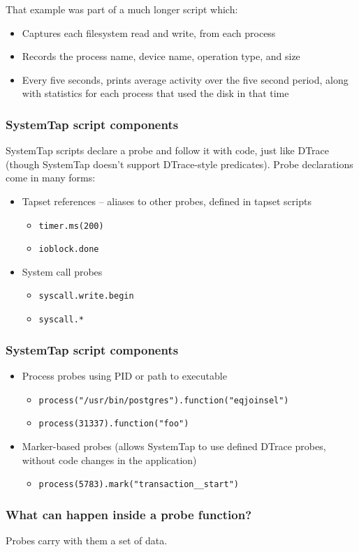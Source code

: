 \documentclass{beamer}
\begin{document}
\begin{frame}
     That example was part of a much longer script which:
     \begin{itemize}
         \item Captures each filesystem read and write, from each process
         \item Records the process name, device name, operation type, and size
         \item Every five seconds, prints average activity over the five second period, along with statistics for each process that used the disk in that time
     \end{itemize}
\end{frame}

\begin{frame}
     \frametitle{SystemTap script components}
     SystemTap scripts declare a probe and follow it with code, just like DTrace (though SystemTap doesn't support DTrace-style predicates). Probe declarations come in many forms:
     \begin{itemize}
         \item Tapset references -- aliases to other probes, defined in tapset scripts
         \begin{itemize}
             \item \texttt{timer.ms(200)}
             \item \texttt{ioblock.done}
         \end{itemize}
         \item System call probes
         \begin{itemize}
             \item \texttt{syscall.write.begin}
             \item \texttt{syscall.*}
         \end{itemize}
     \end{itemize}
\end{frame}

\begin{frame}
     \frametitle{SystemTap script components}
     \begin{itemize}
         \item Process probes using PID or path to executable
         \begin{itemize}
             \item \texttt{process("/usr/bin/postgres").function("eqjoinsel")}
             \item \texttt{process(31337).function("foo")}
         \end{itemize}
         \item Marker-based probes (allows SystemTap to use defined DTrace probes, without code changes in the application)
         \begin{itemize}
             \item \texttt{process(5783).mark("transaction\_\_start")}
         \end{itemize}
     \end{itemize}
\end{frame}

\begin{frame}
     \frametitle{What can happen inside a probe function?}
     Probes carry with them a set of data. 
\end{frame}
\end{document}
